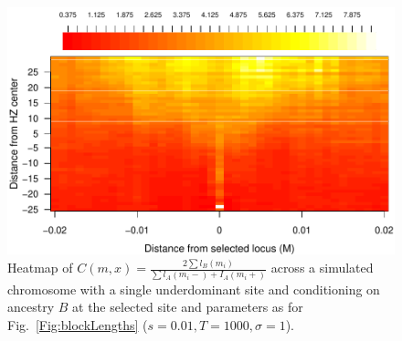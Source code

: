 \begin{figure}
\includegraphics{figs/ratioAdjacentBlocksAlongChromHeatmapAncBConditioning.pdf}
    \caption{Heatmap of $C(m,x)=\frac{2\sum{l_B(m_i)}}{\sum{l_A(m_i-)+I_A(m_i+)}}$ across a simulated chromosome with a single underdominant site and conditioning on ancestry $B$ at the selected site and parameters as for Fig.~\ref{Fig:blockLengths} ($s=0.01, T=1000, \sigma=1$). }\label{Supp:ratioBlockAdjacentHeatmap}
\end{figure}


